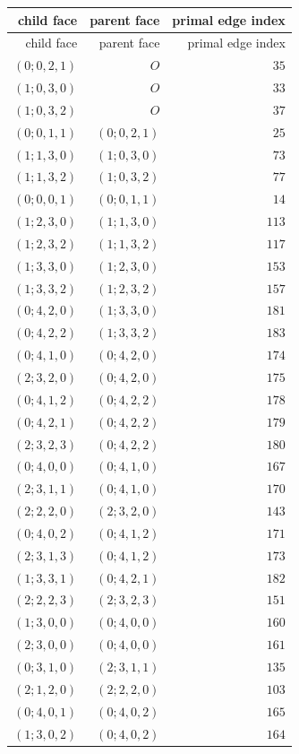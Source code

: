 \begin{longtable}{@{}rrr@{}}
\toprule child face & parent face & primal edge index\\ \midrule
\endfirsthead \toprule child face & parent face & primal edge index\\ \midrule \endhead
$(0;0,2,1)$ & $O$ & $35$\\
$(1;0,3,0)$ & $O$ & $33$\\
$(1;0,3,2)$ & $O$ & $37$\\
$(0;0,1,1)$ & $(0;0,2,1)$ & $25$\\
$(1;1,3,0)$ & $(1;0,3,0)$ & $73$\\
$(1;1,3,2)$ & $(1;0,3,2)$ & $77$\\
$(0;0,0,1)$ & $(0;0,1,1)$ & $14$\\
$(1;2,3,0)$ & $(1;1,3,0)$ & $113$\\
$(1;2,3,2)$ & $(1;1,3,2)$ & $117$\\
$(1;3,3,0)$ & $(1;2,3,0)$ & $153$\\
$(1;3,3,2)$ & $(1;2,3,2)$ & $157$\\
$(0;4,2,0)$ & $(1;3,3,0)$ & $181$\\
$(0;4,2,2)$ & $(1;3,3,2)$ & $183$\\
$(0;4,1,0)$ & $(0;4,2,0)$ & $174$\\
$(2;3,2,0)$ & $(0;4,2,0)$ & $175$\\
$(0;4,1,2)$ & $(0;4,2,2)$ & $178$\\
$(0;4,2,1)$ & $(0;4,2,2)$ & $179$\\
$(2;3,2,3)$ & $(0;4,2,2)$ & $180$\\
$(0;4,0,0)$ & $(0;4,1,0)$ & $167$\\
$(2;3,1,1)$ & $(0;4,1,0)$ & $170$\\
$(2;2,2,0)$ & $(2;3,2,0)$ & $143$\\
$(0;4,0,2)$ & $(0;4,1,2)$ & $171$\\
$(2;3,1,3)$ & $(0;4,1,2)$ & $173$\\
$(1;3,3,1)$ & $(0;4,2,1)$ & $182$\\
$(2;2,2,3)$ & $(2;3,2,3)$ & $151$\\
$(1;3,0,0)$ & $(0;4,0,0)$ & $160$\\
$(2;3,0,0)$ & $(0;4,0,0)$ & $161$\\
$(0;3,1,0)$ & $(2;3,1,1)$ & $135$\\
$(2;1,2,0)$ & $(2;2,2,0)$ & $103$\\
$(0;4,0,1)$ & $(0;4,0,2)$ & $165$\\
$(1;3,0,2)$ & $(0;4,0,2)$ & $164$\\

\end{longtable}
